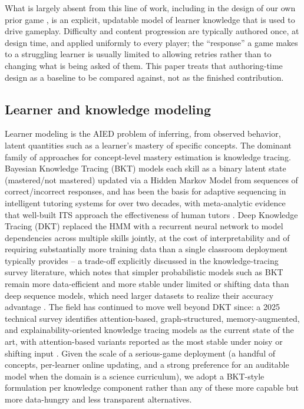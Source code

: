\documentclass[11pt]{article}
\begin{document}
What is largely absent from this line of work, including in the design of our own prior game \cite{ref9}, is an explicit, updatable model of learner knowledge that is used to drive gameplay. Difficulty and content progression are typically authored once, at design time, and applied uniformly to every player; the ``response'' a game makes to a struggling learner is usually limited to allowing retries rather than to changing what is being asked of them. This paper treats that authoring-time design as a baseline to be compared against, not as the finished contribution.

\subsection{Learner and knowledge modeling}

Learner modeling is the AIED problem of inferring, from observed behavior, latent quantities such as a learner's mastery of specific concepts. The dominant family of approaches for concept-level mastery estimation is knowledge tracing. Bayesian Knowledge Tracing (BKT) \cite{ref16} models each skill as a binary latent state (mastered/not mastered) updated via a Hidden Markov Model from sequences of correct/incorrect responses, and has been the basis for adaptive sequencing in intelligent tutoring systems for over two decades, with meta-analytic evidence that well-built ITS approach the effectiveness of human tutors \cite{ref17}. Deep Knowledge Tracing (DKT) \cite{ref18} replaced the HMM with a recurrent neural network to model dependencies across multiple skills jointly, at the cost of interpretability and of requiring substantially more training data than a single classroom deployment typically provides -- a trade-off explicitly discussed in the knowledge-tracing survey literature, which notes that simpler probabilistic models such as BKT remain more data-efficient and more stable under limited or shifting data than deep sequence models, which need larger datasets to realize their accuracy advantage \cite{ref19}. The field has continued to move well beyond DKT since: a 2025 technical survey identifies attention-based, graph-structured, memory-augmented, and explainability-oriented knowledge tracing models as the current state of the art, with attention-based variants reported as the most stable under noisy or shifting input \cite{ref29}. Given the scale of a serious-game deployment (a handful of concepts, per-learner online updating, and a strong preference for an auditable model when the domain is a science curriculum), we adopt a BKT-style formulation per knowledge component rather than any of these more capable but more data-hungry and less transparent alternatives.
\end{document}
